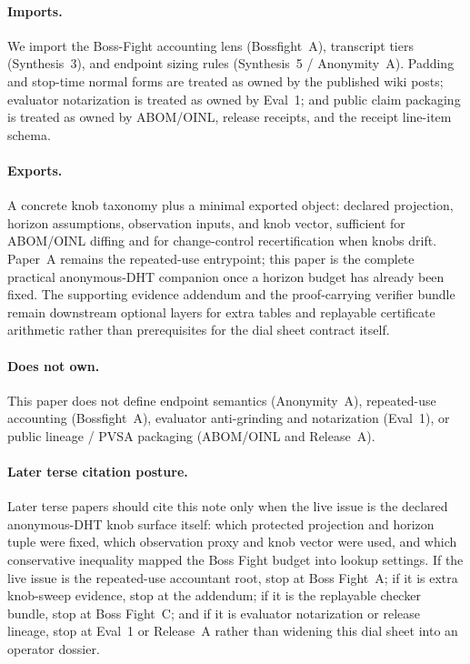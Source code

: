 \documentclass[11pt]{article}
\begin{document}
\paragraph{Imports.}
We import the Boss-Fight accounting lens (Bossfight~A), transcript tiers (Synthesis~3), and endpoint sizing rules (Synthesis~5 / Anonymity~A).
Padding and stop-time normal forms are treated as owned by the published wiki posts; evaluator notarization is treated as owned by Eval~1; and public claim packaging is treated as owned by ABOM/OINL, release receipts, and the receipt line-item schema.\cite{series:artifactpolicy,series:notarizedcerts,series:abomoinl,series:releaseproperty,series:receiptitems}

\paragraph{Exports.}
A concrete knob taxonomy plus a minimal exported object: declared projection, horizon assumptions, observation inputs, and knob vector, sufficient for ABOM/OINL diffing and for change-control recertification when knobs drift.
Paper~A remains the repeated-use entrypoint; this paper is the complete practical anonymous-DHT companion once a horizon budget has already been fixed.
The supporting evidence addendum and the proof-carrying verifier bundle remain downstream optional layers for extra tables and replayable certificate arithmetic rather than prerequisites for the dial sheet contract itself.

\paragraph{Does not own.}
This paper does not define endpoint semantics (Anonymity~A), repeated-use accounting (Bossfight~A), evaluator anti-grinding and notarization (Eval~1), or public lineage / PVSA packaging (ABOM/OINL and Release~A).

\paragraph{Later terse citation posture.}
Later terse papers should cite this note only when the live issue is the declared anonymous-DHT knob surface itself: which protected projection and horizon tuple were fixed, which observation proxy and knob vector were used, and which conservative inequality mapped the Boss Fight budget into lookup settings.
If the live issue is the repeated-use accountant root, stop at Boss Fight~A; if it is extra knob-sweep evidence, stop at the addendum; if it is the replayable checker bundle, stop at Boss Fight~C; and if it is evaluator notarization or release lineage, stop at Eval~1 or Release~A rather than widening this dial sheet into an operator dossier.\cite{series:bossfightA,series:bossfightBaddendum,series:bossfightC,series:notarizedcerts,series:releaseproperty}
\end{document}
